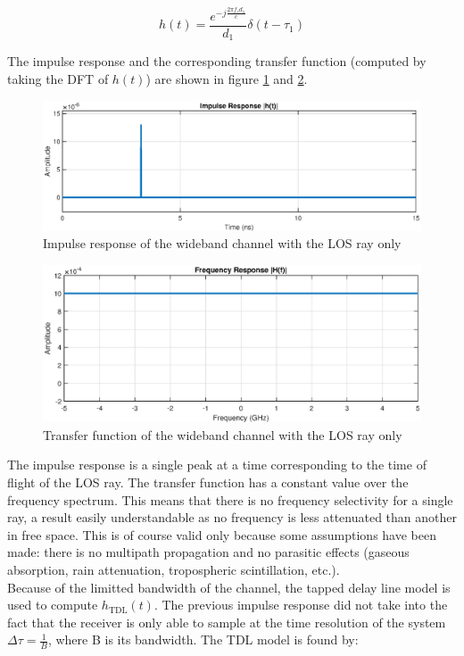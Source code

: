 \documentclass[10pt,a4paper]{ULBreport}
\begin{document}
\begin{equation*}
    h(t) = \frac{e^{-j \frac{2\pi f_cd_1}{c}}}{d_1} \delta(t - \tau_1)
\end{equation*}

The impulse response and the corresponding transfer function (computed by taking the DFT of $h(t)$) are shown in figure \ref{fig:impulse_response} and \ref{fig:transfer_function}. 

\begin{figure}[H]
    \centering
    \includegraphics[width=1\textwidth]{4_1_temp.eps}
    \caption{Impulse response of the wideband channel with the LOS ray only} 
    \label{fig:impulse_response}
\end{figure}

\begin{figure}[H]
    \centering
    \includegraphics[width=1\textwidth]{4_1_freq.eps}
    \caption{Transfer function of the wideband channel with the LOS ray only}
    \label{fig:transfer_function}
\end{figure}

The impulse response is a single peak at a time corresponding to the time of flight of the LOS ray. The transfer function has a constant value over the frequency spectrum. This means that there is no frequency selectivity for a single ray, a result easily understandable as no frequency is less attenuated than another in free space. This is of course valid only because some assumptions have been made: there is no multipath propagation and no parasitic effects (gaseous absorption, rain attenuation, tropospheric scintillation, etc.).\\
Because of the limitted bandwidth of the channel, the tapped delay line model is used to compute $h_{\text{TDL}}(t)$. The previous impulse response did not take into the fact that the receiver is only able to sample at the time resolution of the system $\Delta\tau = \frac{1}{B}$, where B is its bandwidth. The TDL model is found by:
\end{document}
